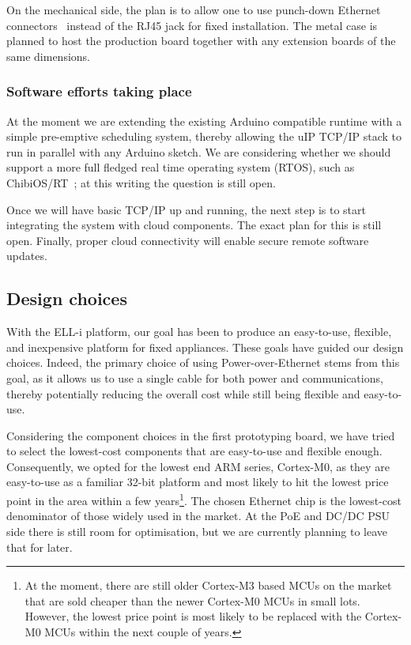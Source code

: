\documentclass[draft,a4paper]{siamltex}
\begin{document}
On the mechanical side, the plan is to allow one to use
punch-down Ethernet connectors~\cite{Krone} instead of the RJ45 jack
for fixed installation.  The metal case is planned to host the
production board together with any extension boards of the same
dimensions.

\subsubsection{Software efforts taking place}

At the moment we are extending the existing Arduino compatible runtime
with a simple pre-emptive scheduling system, thereby allowing the uIP
TCP/IP stack to run in parallel with any Arduino sketch.  We are
considering whether we should support a more full fledged real time
operating system (RTOS), such as ChibiOS/RT~\cite{ChibiOS}; at this
writing the question is still open.

Once we will have basic TCP/IP up and running, the next step is to
start integrating the system with cloud components.  The exact plan
for this is still open.  Finally, proper cloud connectivity will
enable secure remote software updates.

\subsection{Design choices}


With the ELL-i platform, our goal has been to produce an easy-to-use,
flexible, and inexpensive platform for fixed appliances.  These goals
have guided our design choices.  Indeed, the primary choice of using
Power-over-Ethernet stems from this goal, as it allows us to use a
single cable for both power and communications, thereby potentially
reducing the overall cost while still being flexible and easy-to-use.

Considering the component choices in the first prototyping board, we
have tried to select the lowest-cost components that are easy-to-use
and flexible enough.  Consequently, we opted for the lowest end ARM
series, Cortex-M0, as they are easy-to-use as a familiar 32-bit
platform and most likely to hit the lowest price point in the area
within a few years\footnote{At the moment, there are still older
  Cortex-M3 based MCUs on the market that are sold cheaper than the
  newer Cortex-M0 MCUs in small lots.  However, the lowest price
  point is most likely to be replaced with the Cortex-M0 MCUs within
  the next couple of years.}.
The chosen Ethernet chip is the lowest-cost denominator of those
widely used in the market.  At the PoE and DC/DC PSU side there is
still room for optimisation, but we are currently planning to leave
that for later.
\end{document}
